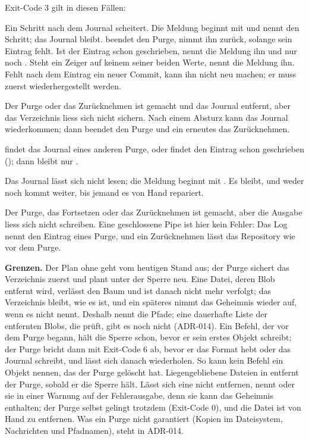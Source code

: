 Exit-Code 3 gilt in diesen Fällen:

\startitemize
\item Ein Schritt nach dem Journal scheitert. Die Meldung beginnt mit
 und nennt den Schritt; das Journal bleibt.
 beendet den Purge,  nimmt ihn zurück, solange sein Eintrag fehlt.
Ist der Eintrag schon geschrieben, nennt die Meldung ihn und nur noch .
Steht ein Zeiger auf keinem seiner beiden Werte, nennt die Meldung ihn.
Fehlt nach dem Eintrag ein neuer Commit, kann  ihn nicht neu machen;
er muss zuerst wiederhergestellt werden.
\item Der Purge oder das Zurücknehmen ist gemacht und das Journal entfernt, aber das
Verzeichnis liess sich nicht sichern. Nach einem Absturz kann das Journal wiederkommen;
dann beendet  den Purge und ein erneutes  das Zurücknehmen.
\item {} findet das Journal eines anderen Purge, oder  findet den
Eintrag  schon geschrieben (); dann bleibt nur
.
\item Das Journal lässt sich nicht lesen; die Meldung beginnt mit
. Es bleibt, und weder  noch
 kommt weiter, bis jemand es von Hand repariert.
\item Der Purge, das Fortsetzen oder das Zurücknehmen ist gemacht, aber die Ausgabe liess sich
nicht schreiben. Eine geschlossene Pipe ist hier kein Fehler: Das Log nennt den Eintrag eines
Purge, und ein Zurücknehmen lässt das Repository wie vor dem Purge.
\stopitemize

{\bf Grenzen.} Der Plan ohne  geht vom heutigen Stand aus; der Purge sichert
das Verzeichnis zuerst und plant unter der Sperre neu.
Eine Datei, deren Blob entfernt wird, verlässt den Baum und ist danach nicht mehr verfolgt;
das Verzeichnis bleibt, wie es ist, und ein späteres  nimmt das Geheimnis wieder
auf, wenn  es nicht nennt. Deshalb nennt  die Pfade; eine
dauerhafte Liste der entfernten Blobs, die  prüft, gibt es noch nicht (ADR-014).
Ein Befehl, der vor dem Purge begann, hält die Sperre schon, bevor er sein erstes Objekt
schreibt; der Purge bricht dann mit Exit-Code 6 ab, bevor er das Format hebt oder das Journal
schreibt, und lässt sich danach wiederholen. So kann kein Befehl ein Objekt nennen, das der
Purge gelöscht hat.
Liegengebliebene Dateien in  entfernt der Purge, sobald er die Sperre hält.
Lässt sich eine nicht entfernen, nennt  oder  sie in einer
Warnung auf der Fehlerausgabe, denn sie kann das Geheimnis enthalten;
der Purge selbst gelingt trotzdem (Exit-Code 0), und die Datei ist von Hand zu entfernen.
Was ein Purge nicht garantiert (Kopien im Dateisystem, Nachrichten und Pfadnamen),
steht in ADR-014.


